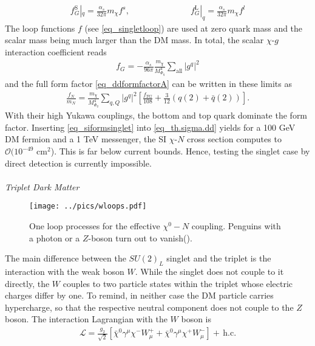 \begin{align}
 f_G^\text{S}|_q = \frac{\alpha_s}{32\pi} m_\chi f^s,\hspace{3cm} f_G^\text{L}|_q = \frac{\alpha_s}{32\pi} m_\chi f^l
 \label{eq_ldsdLoop}
\end{align}
The loop functions $f$ (see \eqref{eq_singletloop}) are used at zero quark mass and the scalar mass being much larger than the DM mass.
In total, the scalar $\chi$-$g$ interaction coefficient reads
\begin{align}
 f_G = -\frac{\alpha_s}{96\pi} \frac{m_\chi}{M_{\Phi_q}^4} \sum\limits_{\text{all}} |g^q|^2
\end{align}
and the full form factor \eqref{eq_ddformfactorA} can be written in these limits as
\begin{align}
 \frac{f_N}{m_N} = \frac{m_\chi}{M_{\Phi_q}^4} \sum\limits_{q,Q} \left|g^q\right|^2 \left[\frac{f_{TG}}{108} + \frac{3}{12}\left(q(2) + \bar q(2)\right)\right].
 \label{eq_siformsinglet}
\end{align}
With their high Yukawa couplings, the bottom and top quark dominate the form factor. Inserting \eqref{eq_siformsinglet} into \eqref{eq_th.sigma.dd}
yields for a 100 GeV DM fermion and a 1 TeV messenger, the SI $\chi$-$N$ cross section computes to $\mathcal{O}(10^{-49}$ cm$^2$). This is far below
current bounds. Hence, testing the singlet case by direct detection is currently impossible.
\\ \\ \textit{Triplet Dark Matter}\\
\begin{figure}[t]
 \texttt{[image: ../pics/wloops.pdf]}
 \caption{One loop processes for the effective $\chi^0-N$ coupling. Penguins with a photon or a $Z$-boson turn out to vanish(\cite{1104.0228}).}
 \label{pic_wloop}
\end{figure}
\noindent The main difference between the $SU(2)_L$ singlet and the triplet is the interaction with the weak boson $W$. While the singlet does not couple to
it directly, the $W$ couples to two particle states within the triplet whose electric charges differ by one. To remind, in neither case the 
DM particle carries hypercharge, so that the respective neutral component does not couple to the $Z$ boson. The interaction Lagrangian with the $W$ 
boson is 
\begin{align}
 \mathcal{L} = \frac{g_2}{\sqrt{2}} \left[\bar \chi^0 \gamma^\mu \chi^- W^+_\mu + \bar \chi^0 \gamma^\mu \chi^+W^-_\mu\right] +\, \text{h.c.}
\end{align}
